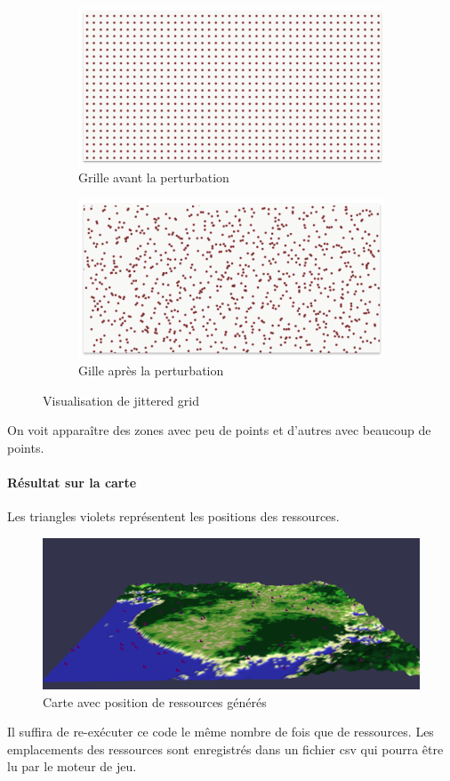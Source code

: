 \begin{figure}[!h]
    \centering
    \begin{subfigure}{0.4\linewidth}
        \centering
        \includegraphics[width=\linewidth]{images/grille.png}
        \caption{Grille avant la perturbation}
        \label{fig:image_avant_expansion}
    \end{subfigure}
    \hfill
    \begin{subfigure}{0.4\linewidth}
        \centering
        \includegraphics[width=\linewidth]{images/jitter.png}
        \caption{Gille après la perturbation}
        \label{fig:histo_avant_expansion}
    \end{subfigure}
    \caption{Visualisation de jittered grid}
\end{figure}

On voit apparaître des zones avec peu de points et d'autres avec beaucoup de points.

\paragraph{Résultat sur la carte}
Les triangles violets représentent les positions des ressources.
\begin{figure}[!h]
    \centering
    \includegraphics[width=0.5\linewidth]{images/mapjitter.png}
    \caption{Carte avec position de ressources générés}
    \label{fig:enter-label}
\end{figure}

Il suffira de re-exécuter ce code le même nombre de fois que de ressources. Les emplacements des ressources sont enregistrés dans un fichier csv qui pourra être lu par le moteur de jeu.